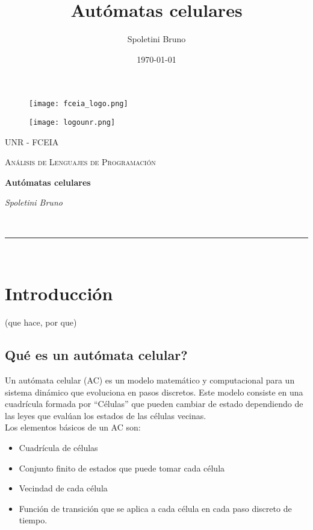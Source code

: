\documentclass[a4paper,11pt]{article}
\makeatletter
\def\PARTICIPANTES{Spoletini Bruno}
\def\MATERIA{Análisis de Lenguajes de Programación}
\def\TITULOTRABAJO{Autómatas celulares}
\newcommand{\linia}{\rule{\linewidth}{0.5pt}}
\theoremstyle{mytheor}
\renewcommand{\maketitle}{
\begin{center}
\vspace{2ex}
{\huge \textsc{\@title}}
\vspace{1ex}
\\
\linia\\
\@author \hfill \@date
\vspace{4ex}
\end{center}
}
\makeatother
\begin{document}
\begin{titlepage}
	\centering

	\begin{figure}[t]
	\raggedleft
    \texttt{[image: fceia\_logo.png]}
    \hfill
	\raggedright
    \texttt{[image: logounr.png]}
    \end{figure}
    \vspace{5cm}
	{\scshape\LARGE UNR - FCEIA \par}
	\vspace{1cm}
	{\scshape\Large \MATERIA\par}
	\vspace{1.5cm}
	{\Huge\bfseries \TITULOTRABAJO\par}
	\vspace{2cm}
	{\Large\itshape \PARTICIPANTES \par}
	\vspace{4cm}


	\vfill

\end{titlepage}

\title{ \TITULOTRABAJO}

\author{\PARTICIPANTES}

\date{\today}

\maketitle





\section{Introducción}
 (que hace, por que)
 \subsection{Qué es un autómata celular?}
Un autómata celular (AC) es un modelo matemático y computacional para un sistema dinámico que evoluciona en pasos discretos. Este modelo consiste en una cuadrícula formada por ``Células'' que pueden cambiar de estado dependiendo de las leyes que evalúan los estados de las células vecinas.\\
Los elementos básicos de un AC son:
\begin{itemize}
    \item Cuadrícula de células
    \item Conjunto finito de estados que puede tomar cada célula
    \item Vecindad de cada célula
    \item Función de transición que se aplica a cada célula en cada paso discreto de tiempo.
\end{itemize}
\end{document}
